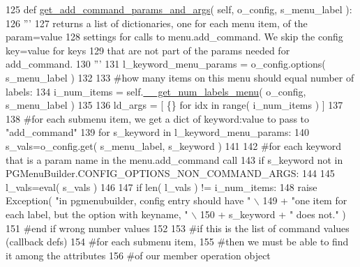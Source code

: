 \begin{DoxyCode}
125     \textcolor{keyword}{def }\hyperlink{classnegui_1_1pgmenubuilder_1_1PGMenuBuilder_a564a7629d3ba8ac1666a6f8a046d82f2}{get\_add\_command\_params\_and\_args}( self,  o\_config, s\_menu\_label ):
126         \textcolor{stringliteral}{'''}
127 \textcolor{stringliteral}{        returns a list of dictionaries, one for each menu item, of the param=value}
128 \textcolor{stringliteral}{        settings for calls to menu.add\_command.  We skip the config key=value for keys}
129 \textcolor{stringliteral}{        that are not part of the params needed for add\_command. }
130 \textcolor{stringliteral}{        '''}
131         l\_keyword\_menu\_params = o\_config.options( s\_menu\_label )    
132 
133         \textcolor{comment}{#how many items on this menu should equal number of labels:}
134         i\_num\_items = self.\hyperlink{classnegui_1_1pgmenubuilder_1_1PGMenuBuilder_a70776ac09761aeef9ee6df67c1dd9140}{\_\_get\_num\_labels\_menu}( o\_config, s\_menu\_label )
135 
136         ld\_args = [ \{\} \textcolor{keywordflow}{for} idx \textcolor{keywordflow}{in} range( i\_num\_items ) ]
137 
138         \textcolor{comment}{#for each submenu item, we get a dict of keyword:value to pass to "add\_command"}
139         \textcolor{keywordflow}{for} s\_keyword \textcolor{keywordflow}{in} l\_keyword\_menu\_params:
140             s\_vals=o\_config.get( s\_menu\_label, s\_keyword )
141 
142             \textcolor{comment}{#for each keyword that is a param name in the menu.add\_command call}
143             \textcolor{keywordflow}{if} s\_keyword \textcolor{keywordflow}{not} \textcolor{keywordflow}{in} PGMenuBuilder.CONFIG\_OPTIONS\_NON\_COMMAND\_ARGS:
144 
145                 l\_vals=eval( s\_vals )
146 
147                 \textcolor{keywordflow}{if} len( l\_vals ) != i\_num\_items:
148                     \textcolor{keywordflow}{raise} Exception( \textcolor{stringliteral}{"in pgmenubuilder, config entry should have "} \(\backslash\)
149                             + \textcolor{stringliteral}{"one item for each label, but the option with keyname, "} \(\backslash\)
150                             + s\_keyword + \textcolor{stringliteral}{" does not."} )
151                 \textcolor{comment}{#end if wrong number values}
152                 
153                 \textcolor{comment}{#if this is the list of command values (callback defs) }
154                 \textcolor{comment}{#for each submenu item,}
155                 \textcolor{comment}{#then we must be able to find it among the attributes}
156                 \textcolor{comment}{#of our member operation object}

\end{DoxyCode}
